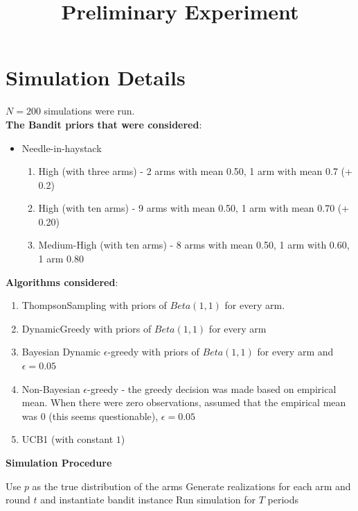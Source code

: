 \documentclass[11pt,letterpaper]{article}
\begin{document}
 

\title{Preliminary Experiment}
\maketitle

\section*{Simulation Details}

$N = 200$ simulations were run. \\
\textbf{The Bandit priors that were considered}:
\begin{itemize}
\item Needle-in-haystack
\begin{enumerate}
\item High (with three arms) - 2 arms with mean 0.50, 1 arm with mean 0.7 (+ 0.2)
\item High (with ten arms) - 9 arms with mean 0.50, 1 arm with mean 0.70 (+ 0.20)
\item Medium-High (with ten arms) - 8 arms with mean 0.50, 1 arm with 0.60, 1 arm 0.80
\end{enumerate}
\end{itemize}
\textbf{Algorithms considered}:
\begin{enumerate}
\item ThompsonSampling with priors of $Beta(1, 1)$ for every arm.
\item DynamicGreedy with priors of $Beta(1, 1)$ for every arm
\item Bayesian Dynamic $\epsilon$-greedy with priors of $Beta(1, 1)$ for every arm and $\epsilon = 0.05$
\item Non-Bayesian $\epsilon$-greedy - the greedy decision was made based on empirical mean. When there were zero observations, assumed that the empirical mean was 0 (this seems questionable), $\epsilon = 0.05$
\item UCB1 (with constant $1$)
\end{enumerate}
\pagebreak
\textbf{Simulation Procedure}
\begin{algorithm}
\begin{algorithmic}[1]
		\State Use $p$ as the true distribution of the arms
		\State Generate realizations for each arm and round $t$ and instantiate bandit instance
			\State Run simulation for $T$ periods
		\EndFor
	\EndFor
\EndFor
\end{algorithmic}
\end{algorithm}
\end{document}

